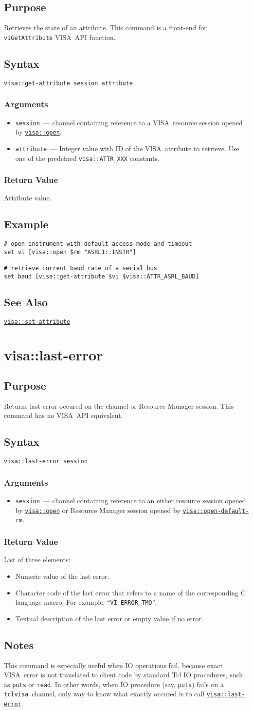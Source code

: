 \documentclass[12pt, a4paper]{report}
\newcommand{\tclvisa}{{\tt tclvisa }}
\newcommand{\VISA}{\mbox{VISA }}
\newcommand{\COMMANDREF}[1]{{\tt \hyperref[#1]{#1}}}
\newcommand{\VISACOMMANDREF}[1]{{\tt \mbox{#1}}\index{#1}}
\newcommand{\TCLCOMMANDREF}[1]{{\tt \mbox{#1}}\index{#1}}
\newcommand{\SEEALSO}{\subsection*{See Also}}
\newcommand{\EXAMPLE}{\subsection*{Example}}
\newcommand{\PURPOSE}{\subsection*{Purpose}}
\newcommand{\SYNTAX}[1]{\subsection*{Syntax}{\tt #1}}
\newcommand{\NOTES}{\subsection*{Notes}}
\newcommand{\ARGUMENTS}{\subsubsection*{Arguments}}
\newcommand{\RETURN}{\subsubsection*{Return Value}}
\newcommand{\COMMAND}[1]{\section{#1}\label{#1}}
\newcommand{\BEGINARGUMENTS}{\ARGUMENTS\begin{itemize}}
\newcommand{\ENDARGUMENTS}{\end{itemize}}
\newcommand{\ARGUMENT}[1]{\item {\tt \mbox{#1}}~---}
\newcommand{\ARGCHANNEL}{\ARGUMENT{session} channel containing reference to a \VISA resource session opened by \COMMANDREF{visa::open}.}
\begin{document}
\PURPOSE

Retrieves the state of an attribute. This command is a front-end for \VISACOMMANDREF{viGetAttribute} \VISA API function.

\SYNTAX{visa::get-attribute session attribute}

\BEGINARGUMENTS
\ARGCHANNEL
\ARGUMENT{attribute} Integer value with ID of the \VISA attribute to retrieve. Use one of the predefned {\tt visa::ATTR\_XXX} constants.
\ENDARGUMENTS

\RETURN

Attribute value.

\EXAMPLE

\begin{verbatim} 
# open instrument with default access mode and timeout
set vi [visa::open $rm "ASRL1::INSTR"]

# retrieve current baud rate of a serial bus
set baud [visa::get-attribute $vi $visa::ATTR_ASRL_BAUD]
\end{verbatim} 

\SEEALSO

\COMMANDREF{visa::set-attribute}


\COMMAND{visa::last-error}

\PURPOSE

Returns last error occured on the channel or Resource Manager session. This command has no \VISA API equivalent.

\SYNTAX{visa::last-error session}

\BEGINARGUMENTS
\ARGUMENT{session} channel containing reference to an either resource session opened by \COMMANDREF{visa::open} or Resource Manager session opened by \COMMANDREF{visa::open-default-rm}.
\ENDARGUMENTS

\RETURN

List of three elements:

\begin{itemize}
\item Numeric value of the last error.
\item Character code of the last error that refers to a name of the corresponding C language macro. For example, ``{\tt VI\_ERROR\_TMO}''.
\item Textual description of the last error or empty value if no error.
\end{itemize}

\NOTES

This command is especially useful when IO operations fail, because exact \VISA error is not translated to client code by standard Tcl IO procedures, such as \TCLCOMMANDREF{puts} or \TCLCOMMANDREF{read}. In other words, when IO procedure (say, \TCLCOMMANDREF{puts}) fails on a \tclvisa channel, only way to know what exactly occured is to call \COMMANDREF{visa::last-error}.
\end{document}
